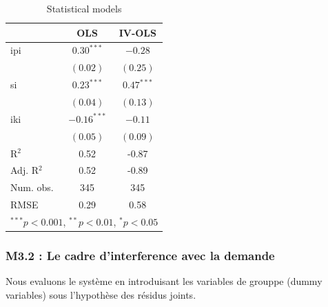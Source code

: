 \documentclass[11pt,]{article}
\begin{document}
\begin{table}[!htbp]
\begin{center}
\begin{tabular}{l c c }
\hline
 & OLS & IV-OLS \\
\hline
ipi        & $0.30^{***}$  & $-0.28$      \\
           & $(0.02)$      & $(0.25)$     \\
si         & $0.23^{***}$  & $0.47^{***}$ \\
           & $(0.04)$      & $(0.13)$     \\
iki        & $-0.16^{***}$ & $-0.11$      \\
           & $(0.05)$      & $(0.09)$     \\
\hline
R$^2$      & 0.52          & -0.87        \\
Adj. R$^2$ & 0.52          & -0.89        \\
Num. obs.  & 345           & 345          \\
RMSE       & 0.29          & 0.58         \\
\hline
\multicolumn{3}{l}{\scriptsize{$^{***}p<0.001$, $^{**}p<0.01$, $^*p<0.05$}}
\end{tabular}
\caption{Statistical models}
\label{table : ols et ivols clusters}
\end{center}
\end{table}

\FloatBarrier

\hypertarget{m3.2-le-cadre-dinterference-avec-la-demande}{%
\subsubsection{M3.2 : Le cadre d'interference avec la
demande}\label{m3.2-le-cadre-dinterference-avec-la-demande}}

Nous evaluons le système en introduisant les variables de grouppe (dummy
variables) sous l'hypothèse des résidus joints.

\FloatBarrier
\end{document}
